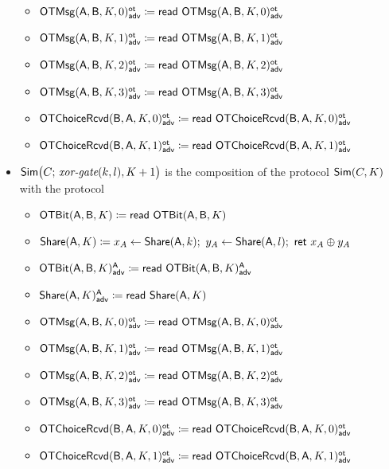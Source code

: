 \begin{itemize}
\begin{itemize}
\item {\color{blue} $\LeakOTMsg(\A,\B,K,0)^\ot_\adv \coloneqq \read{\LeakOTMsg(\A,\B,K,0)^\ot_\adv}$}
\item {\color{blue} $\LeakOTMsg(\A,\B,K,1)^\ot_\adv \coloneqq \read{\LeakOTMsg(\A,\B,K,1)^\ot_\adv}$}
\item {\color{blue} $\LeakOTMsg(\A,\B,K,2)^\ot_\adv \coloneqq \read{\LeakOTMsg(\A,\B,K,2)^\ot_\adv}$}
\item {\color{blue} $\LeakOTMsg(\A,\B,K,3)^\ot_\adv \coloneqq \read{\LeakOTMsg(\A,\B,K,3)^\ot_\adv}$}\medskip
\item {\color{blue} $\LeakOTChoiceRcvd(\B,\A,K,0)^\ot_\adv \coloneqq \read{\LeakOTChoiceRcvd(\B,\A,K,0)^\ot_\adv}$}
\item {\color{blue} $\LeakOTChoiceRcvd(\B,\A,K,1)^\ot_\adv \coloneqq \read{\LeakOTChoiceRcvd(\B,\A,K,1)^\ot_\adv}$}
\end{itemize}
\item $\Sim\big(C; \, \xorgate(k,l),K+1\big)$ is the composition of the protocol $\Sim(C,K)$ with the protocol
\begin{itemize}
\item $\OTBit(\A,\B,K) \coloneqq \read{\OTBit(\A,\B,K)}$
\item $\Share(\A,K) \coloneqq x_A \leftarrow \Share(\A,k); \ y_A \leftarrow \Share(\A,l); \ \ret{x_A \oplus y_A}$\medskip
\item {\color{blue} $\LeakOTBit(\A,\B,K)^\A_\adv \coloneqq \read{\LeakOTBit(\A,\B,K)^\A_\adv}$}
\item {\color{blue} $\LeakShare(\A,K)^\A_\adv \coloneqq \read{\Share(\A,K)}$}\medskip
\item {\color{blue} $\LeakOTMsg(\A,\B,K,0)^\ot_\adv \coloneqq \read{\LeakOTMsg(\A,\B,K,0)^\ot_\adv}$}
\item {\color{blue} $\LeakOTMsg(\A,\B,K,1)^\ot_\adv \coloneqq \read{\LeakOTMsg(\A,\B,K,1)^\ot_\adv}$}
\item {\color{blue} $\LeakOTMsg(\A,\B,K,2)^\ot_\adv \coloneqq \read{\LeakOTMsg(\A,\B,K,2)^\ot_\adv}$}
\item {\color{blue} $\LeakOTMsg(\A,\B,K,3)^\ot_\adv \coloneqq \read{\LeakOTMsg(\A,\B,K,3)^\ot_\adv}$}\medskip
\item {\color{blue} $\LeakOTChoiceRcvd(\B,\A,K,0)^\ot_\adv \coloneqq \read{\LeakOTChoiceRcvd(\B,\A,K,0)^\ot_\adv}$}
\item {\color{blue} $\LeakOTChoiceRcvd(\B,\A,K,1)^\ot_\adv \coloneqq \read{\LeakOTChoiceRcvd(\B,\A,K,1)^\ot_\adv}$}
\end{itemize}

\end{itemize}

